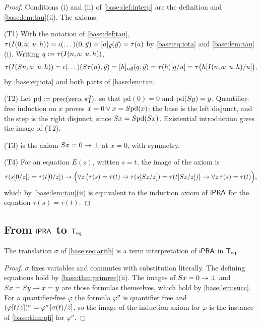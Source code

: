 \begin{proof}
Conditions (i) and (ii) of \cref{base:def:interp} are the definition and
\cref{base:lem:tau}(ii).  The axioms:

(T1) With the notation of \cref{base:def:tau},
$\tau(I(0,a;\,u.\,h))=\iota(\dots)(0,\vec y)=[a]_{\vec y}(\vec y)=\tau(a)$
by \eqref{base:eq:iota} and \cref{base:lem:tau}(i).  Writing
$q\mathrel{:=}\tau(I(n,a;\,u.\,h))$,
\[
 \tau(I(S n,a;\,u.\,h))=\iota(\dots)(S\tau(n),\vec y)
 =[h]_{u\vec y}(q,\vec y)=\tau(h)[q/u]
 =\tau\bigl(h[I(n,a;\,u.\,h)/u]\bigr),
\]
by \eqref{base:eq:iota} and both parts of \cref{base:lem:tau}.

(T2) Let $\mathrm{pd}\mathrel{:=}\mathrm{prec}(\mathrm{zero},\pi^2_1)$, so that
$\mathrm{pd}(0)=0$ and $\mathrm{pd}(S y)=y$.  Quantifier-free induction
on $x$ proves $x=0\vee x=S\mathrm{pd}(x)$: the base is the left disjunct,
and the step is the right disjunct, since
$S x=S\mathrm{pd}(S x)$.  Existential introduction gives the image
of (T2).

(T3) is the axiom $S x=0\to\bot$ at $x=0$, with symmetry.

(T4) For an equation $E(z)$, written $s=t$, the image of the axiom is
\[
 \tau(s[0/z])=\tau(t[0/z])\to\Bigl(\forall z\,\bigl(\tau(s)=\tau(t)\to
 \tau(s[S z/z])=\tau(t[S z/z])\bigr)\to
 \forall z\,\tau(s)=\tau(t)\Bigr),
\]
which by \cref{base:lem:tau}(ii) is equivalent to the induction axiom of
$\mathsf{iPRA}$ for the equation $\tau(s)=\tau(t)$.
\end{proof}

\subsection{From \texorpdfstring{$\mathsf{iPRA}$}{iPRA} to
 \texorpdfstring{$\mathsf{T}_{\mathrm{eq}}$}{Teq}}

\begin{proposition}
\label{base:prop:sigma}
The translation $\sigma$ of \cref{base:sec:arith} is a term interpretation
of $\mathsf{iPRA}$ in $\mathsf{T}_{\mathrm{eq}}$.
\end{proposition}

\begin{proof}
$\sigma$ fixes variables and commutes with substitution literally.  The
defining equations hold by \cref{base:thm:primrec}(ii).  The images of
$S x=0\to\bot$ and $S x=S y\to x=y$ are those formulas themselves,
which hold by \cref{base:lem:succ}.  For a quantifier-free $\varphi$ the
formula $\varphi^{\sigma}$ is quantifier free and
$(\varphi[t/z])^{\sigma}=\varphi^{\sigma}[\sigma(t)/z]$, so the
image of the induction axiom for $\varphi$ is the instance of
\cref{base:thm:qfi} for $\varphi^{\sigma}$.
\end{proof}

